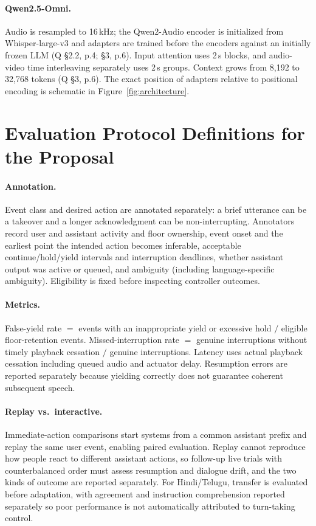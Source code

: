 \documentclass[11pt,a4paper,twocolumn]{article}
\newcommand{\Q}{\textsc{Q}}
\begin{document}
\paragraph{Qwen2.5-Omni.} Audio is resampled to 16\,kHz; the Qwen2-Audio encoder is initialized from Whisper-large-v3 and adapters are trained before the encoders against an initially frozen LLM (\Q{} \S2.2, p.4; \S3, p.6). Input attention uses 2\,s blocks, and audio-video time interleaving separately uses 2\,s groups. Context grows from 8{,}192 to 32{,}768 tokens (\Q{} \S3, p.6). The exact position of adapters relative to positional encoding is schematic in Figure~\ref{fig:architecture}.

\section{Evaluation Protocol Definitions for the Proposal}
\label{app:protocol}

\paragraph{Annotation.} Event class and desired action are annotated separately: a brief utterance can be a takeover and a longer acknowledgment can be non-interrupting. Annotators record user and assistant activity and floor ownership, event onset and the earliest point the intended action becomes inferable, acceptable continue/hold/yield intervals and interruption deadlines, whether assistant output was active or queued, and ambiguity (including language-specific ambiguity). Eligibility is fixed before inspecting controller outcomes.

\paragraph{Metrics.} False-yield rate $=$ events with an inappropriate yield or excessive hold $/$ eligible floor-retention events. Missed-interruption rate $=$ genuine interruptions without timely playback cessation $/$ genuine interruptions. Latency uses actual playback cessation including queued audio and actuator delay. Resumption errors are reported separately because yielding correctly does not guarantee coherent subsequent speech.

\paragraph{Replay vs.\ interactive.} Immediate-action comparisons start systems from a common assistant prefix and replay the same user event, enabling paired evaluation. Replay cannot reproduce how people react to different assistant actions, so follow-up live trials with counterbalanced order must assess resumption and dialogue drift, and the two kinds of outcome are reported separately. For Hindi/Telugu, transfer is evaluated before adaptation, with agreement and instruction comprehension reported separately so poor performance is not automatically attributed to turn-taking control.
\end{document}
